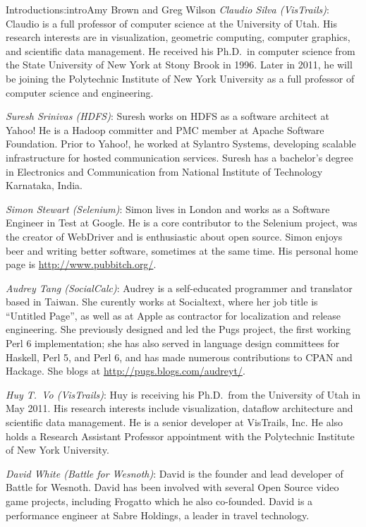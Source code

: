 \begin{aosachapter}{Introduction}{s:intro}{Amy Brown and Greg Wilson}
\emph{Claudio Silva (VisTrails)}: Claudio is a full professor of
computer science at the University of Utah. His research interests are
in visualization, geometric computing, computer graphics, and
scientific data management. He received his Ph.D.\ in computer science
from the State University of New York at Stony Brook in 1996. Later in
2011, he will be joining the Polytechnic Institute of New York
University as a full professor of computer science and engineering.

\emph{Suresh Srinivas (HDFS)}: Suresh works on HDFS as a software
architect at Yahoo! He is a Hadoop committer and PMC member at Apache
Software Foundation. Prior to Yahoo!, he worked at Sylantro Systems,
developing scalable infrastructure for hosted communication
services. Suresh has a bachelor's degree in Electronics and
Communication from National Institute of Technology Karnataka, India.

\emph{Simon Stewart (Selenium)}: Simon lives in London and
works as a Software Engineer in Test at Google. He is a core
contributor to the Selenium project, was the creator of WebDriver
and is enthusiastic about open source. Simon enjoys beer and
writing better software, sometimes at the same time.  His personal
home page is \url{http://www.pubbitch.org/}.

\emph{Audrey Tang (SocialCalc)}: Audrey is a self-educated programmer
and translator based in Taiwan.  She curently works at Socialtext,
where her job title is ``Untitled Page'', as well as at Apple as
contractor for localization and release engineering.  She previously
designed and led the Pugs project, the first working Perl 6
implementation; she has also served in language design committees for
Haskell, Perl 5, and Perl 6, and has made numerous contributions to
CPAN and Hackage.  She blogs at \url{http://pugs.blogs.com/audreyt/}.

\pagebreak

\emph{Huy T.\ Vo (VisTrails)}: Huy is receiving his Ph.D.\ from the
University of Utah in May 2011. His research interests include
visualization, dataflow architecture and scientific data
management. He is a senior developer at VisTrails, Inc. He also holds
a Research Assistant Professor appointment with the Polytechnic
Institute of New York University.

\emph{David White (Battle for Wesnoth)}: David is the founder and lead
developer of Battle for Wesnoth. David has been involved with several Open
Source video game projects, including Frogatto which he also co-founded. David
is a performance engineer at Sabre Holdings, a leader in travel technology. 


\end{aosachapter}
